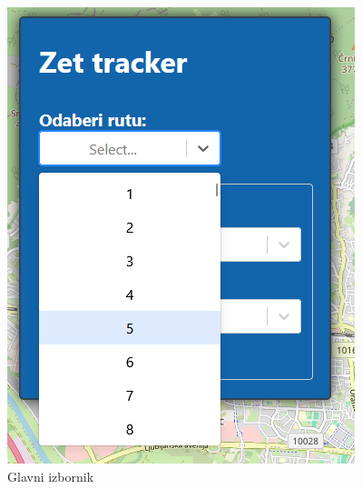 \documentclass[zavrsnirad]{fer}
\begin{document}
\begin{figure}[H]
	\centering
	\begin{minipage}[c]{0.3\textwidth}
		\centering
		\includegraphics[width=\textwidth]{Figures/glavni.png}
		\caption{Glavni izbornik}
		\label{slk:glavni}
	\end{minipage}
	\hfill
	\begin{minipage}[c]{0.3\textwidth}
		\centering

\end{minipage}
\end{figure}
\end{document}
